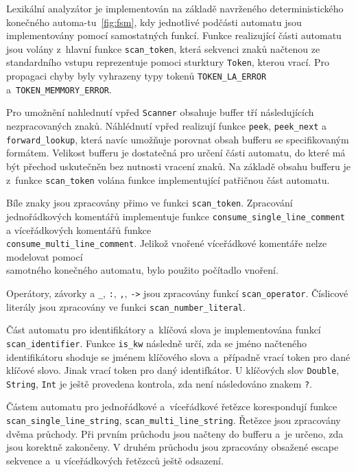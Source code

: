 \documentclass[11pt]{article}
\begin{document}
Lexikální analyzátor je implementován na základě navrženého deterministického konečného automa-tu~\href{fig:fsm}{\ref{fig:fsm}}, kdy jednotlivé podčásti automatu
jsou implementovány pomocí samostatných funkcí. Funkce realizující části automatu jsou volány z~hlavní funkce \texttt{scan\_token},
která sekvenci znaků načtenou ze standardního vstupu reprezentuje pomoci sturktury \texttt{Token}, kterou vrací. Pro propagaci chyby byly vyhrazeny
typy tokenů \texttt{TOKEN\_LA\_ERROR} a~\texttt{TOKEN\_MEMMORY\_ERROR}.

Pro umožnění nahlednutí vpřed \texttt{Scanner} obsahuje buffer tří následujících nezpracovaných znaků.
Náhlédnutí vpřed realizují funkce \texttt{peek}, \texttt{peek\_next} a \texttt{forward\_lookup}, která navíc umožňuje
porovnat obsah bufferu se specifikovaným formátem. Velikost bufferu je dostatečná pro určení části automatu,
do které má být přechod uskutečněn bez nutnosti vracení znaků. Na základě obsahu bufferu je z~funkce \texttt{scan\_token} volána 
funkce implementující patřičnou část automatu.


Bíle znaky jsou zpracovány přimo ve funkci \texttt{scan\_token}. Zpracování jednořádkových komentářů implementuje funkce
\texttt{consume\_single\_line\_comment} a víceřádkových komentářů funkce \\ \texttt{consume\_multi\_line\_comment}. Jelikož vnořené
víceřádkové komentáře nelze modelovat pomocí\\ samotného konečného automatu, bylo použito počítadlo vnoření.

Operátory, závorky a \texttt{\_}, \texttt{:}, \texttt{,}, \texttt{->} jsou zpracovány funkcí \texttt{scan\_operator}.
Číslicové literály jsou zpracovány ve funkci \texttt{scan\_number\_literal}.

Část automatu pro identifikátory a~klíčová slova je implementována funkcí \texttt{scan\_identifier}.
Funkce \texttt{is\_kw} následně určí, zda se jméno načteného identifikátoru shoduje se jménem klíčového slova a~případně
vrací token pro dané klíčové slovo. Jinak vrací token pro daný identifkátor. U klíčových slov \texttt{Double}, \texttt{String}, \texttt{Int}
je ještě provedena kontrola, zda není následováno znakem \texttt{?}.

Částem automatu pro jednořádkové a~víceřádkové řetězce korespondují funkce \\ \texttt{scan\_single\_line\_string}, \texttt{scan\_multi\_line\_string}.
Řetězce jsou zpracovány dvěma průchody. Při prvním průchodu jsou načteny do bufferu a~je určeno, zda jsou korektně zakončeny. V druhém průchodu
jsou zpracovány obsažené escape sekvence a~u víceřádkových řetězcců ještě odsazení.
\end{document}

